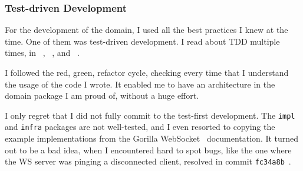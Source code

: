 \subsubsection{Test-driven Development}\label{sec:test-driven-development}

For the development of the domain,
I used all the best practices I knew at the time.
One of them was test-driven development.
I read about \ac{TDD} multiple times, in
~\cite{beck_test-driven_2002},
~\cite{martin_clean_2011}, and
~\cite{beck_extreme_2004}.

I followed the red, green, refactor cycle,
checking every time that I understand
the usage of the code I wrote.
It enabled me to have an architecture
in the domain package I am proud of,
without a huge effort.

I only regret that
I did not fully commit to the test-first development.
The \texttt{impl} and \texttt{infra} packages
are not well-tested,
and I even resorted to copying the example implementations
from the Gorilla WebSocket~\cite{burd_gorilla_2022} documentation.
It turned out to be a bad idea,
when I encountered hard to spot bugs,
like the one
where the \ac{WS} server
was pinging a disconnected client,
resolved in commit \texttt{fc34a8b}~.


